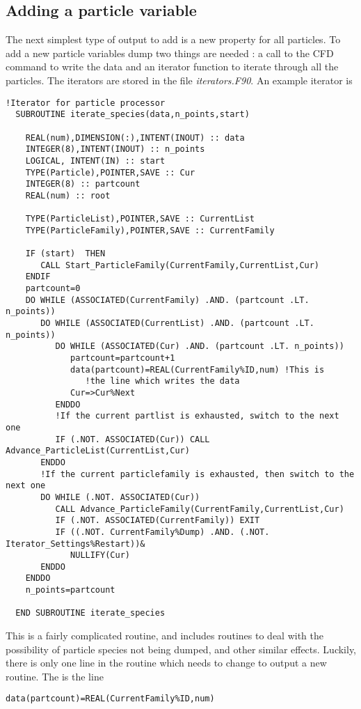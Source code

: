 \documentclass[12pt]{article}
\newcommand{\simpleboxverbatim}{\begin{Verbatim}[obeytabs=true,frame=single,
  framerule=0.5mm,rulecolor=\color{warwickmid}]}
\begin{document}
\subsection{Adding a particle variable}
The next simplest type of output to add is a new property for all particles. To
add a new particle variables dump two things are needed : a call to the CFD
command to write the data and an iterator function to iterate through all the
particles. The iterators are stored in the file {\it iterators.F90}. An example
iterator is

\simpleboxverbatim
  !Iterator for particle processor
  SUBROUTINE iterate_species(data,n_points,start)

    REAL(num),DIMENSION(:),INTENT(INOUT) :: data
    INTEGER(8),INTENT(INOUT) :: n_points
    LOGICAL, INTENT(IN) :: start
    TYPE(Particle),POINTER,SAVE :: Cur
    INTEGER(8) :: partcount
    REAL(num) :: root

    TYPE(ParticleList),POINTER,SAVE :: CurrentList
    TYPE(ParticleFamily),POINTER,SAVE :: CurrentFamily

    IF (start)  THEN
       CALL Start_ParticleFamily(CurrentFamily,CurrentList,Cur)
    ENDIF
    partcount=0
    DO WHILE (ASSOCIATED(CurrentFamily) .AND. (partcount .LT. n_points))
       DO WHILE (ASSOCIATED(CurrentList) .AND. (partcount .LT. n_points))
          DO WHILE (ASSOCIATED(Cur) .AND. (partcount .LT. n_points))
             partcount=partcount+1
             data(partcount)=REAL(CurrentFamily%ID,num) !This is
                !the line which writes the data
             Cur=>Cur%Next
          ENDDO
          !If the current partlist is exhausted, switch to the next one
          IF (.NOT. ASSOCIATED(Cur)) CALL Advance_ParticleList(CurrentList,Cur)
       ENDDO
       !If the current particlefamily is exhausted, then switch to the next one
       DO WHILE (.NOT. ASSOCIATED(Cur))
          CALL Advance_ParticleFamily(CurrentFamily,CurrentList,Cur)
          IF (.NOT. ASSOCIATED(CurrentFamily)) EXIT
          IF ((.NOT. CurrentFamily%Dump) .AND. (.NOT. Iterator_Settings%Restart))&
             NULLIFY(Cur)
       ENDDO
    ENDDO
    n_points=partcount

  END SUBROUTINE iterate_species
\end{Verbatim}

This is a fairly complicated routine, and includes routines to deal with the
possibility of particle species not being dumped, and other similar
effects. Luckily, there is only one line in the routine which needs to change
to output a new routine. The is the line
\simpleboxverbatim
             data(partcount)=REAL(CurrentFamily%
\end{Verbatim}
\end{document}
